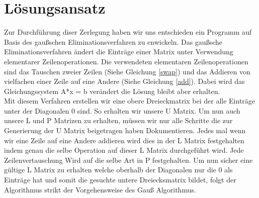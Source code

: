 \documentclass[course=erap]{aspdoc}
\begin{document}
 



\section{Lösungsansatz}
Zur Durchführung diser Zerlegung haben wir uns entschieden ein Programm auf Basis des gaußschen Eliminationsverfahren zu enwickeln.
Das gaußsche Eliminationsverfahren ändert die Einträge einer Matrix unter Verwendung elementarer Zeilenoperationen.
Die verwendeten elementaren Zeilenoperationen sind das Tauschen zweier Zeilen (Siehe Gleichung \ref{swap}) und das Addieren von
vielfachen einer Zeile auf eine Andere (Siehe Gleichung \ref{add}). 
 Dabei wird das Gleichungssystem A*x = b verändert die Lösung bleibt aber erhalten.\\

Mit diesem Verfahren erstellen wir eine obere Dreieckmatrix bei der alle Einträge unter der 
Diagonalen 0 sind. So erhalten wir unsere U Matrix. Um nun auch unsere L und P Matrizen zu erhalten, müssen
wir nur alle Schritte die zur Generierung der U Matrix beigetragen haben Dokumentieren. Jedes mal wenn wir eine Zeile auf eine Andere addieren
wird dies in der L Matrix festgehalten indem genau die selbe Operation auf dieser L Matrix durchgeführt wird. Jede Zeilenvertauschung Wird auf die selbe Art in P festgehalten.  
Um nun sicher eine gültige L Matrix zu erhalten welche oberhalb der Diagonalen nur die 0 als Einträge hat und somit die gesuchte untere Dreiecksmatrix bildet, folgt der Algorithmus strikt der Vorgehensweise des Gauß Algorithmus.\\
\end{document}
